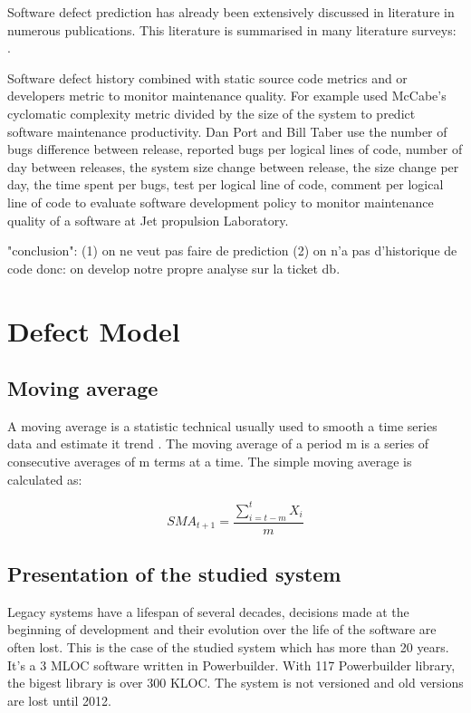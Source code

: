 \documentclass[10pt,conference]{IEEEtran}
\begin{document}

Software defect prediction has already been extensively discussed in literature in numerous publications.
This literature is summarised in many literature surveys: \cite{Catal09,Hall12,Hoss17,Li19a,malh15}.

Software defect history combined with static source code metrics and or developers metric to monitor maintenance quality.
For example \cite{gill91} used McCabe’s cyclomatic complexity metric divided by the size of the system to predict software maintenance productivity.
Dan Port and Bill Taber \cite{port18} use the number of  bugs difference between release, reported bugs per logical lines of code, number of day between releases, the system size change between release, the size change per day, the time spent  per bugs, test per logical line of code, comment per logical line of code to evaluate software development policy  to monitor maintenance quality of a software at Jet propulsion Laboratory.

"conclusion": (1) on ne veut pas faire de prediction (2) on n'a pas d'historique de code
donc: on develop notre propre analyse sur la ticket db.

\section{Defect Model}
\label{sec:defectModel}

\subsection{Moving average}

A moving average is a statistic technical usually used to smooth a time series data and estimate it trend \cite{MOLU17}.
 The moving average of a period m is a series of consecutive averages of m terms at a time. 
 The simple moving average is calculated as:

\begin{equation}
SMA_{t+1}=\frac{\sum\limits_{i=t-m}^t X_i}{m}
\end{equation}

\subsection{Presentation of the studied system}
Legacy systems have a lifespan of several decades, decisions made at the beginning of development and their evolution over the life of the software are often lost. 
This is the case of the studied system  which has more than 20 years. 
It's a 3 MLOC software written in Powerbuilder. With 117 Powerbuilder library, the  bigest library is  over 300 KLOC.
The system is not versioned and old versions are lost until 2012.
\end{document}
